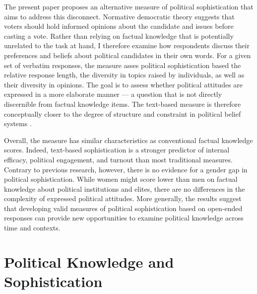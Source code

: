 \documentclass[12pt]{article}
\begin{document}
The present paper proposes an alternative measure of political sophistication that aims to address this disconnect. Normative democratic theory suggests that voters should hold informed opinions about the candidate and issues before casting a vote. Rather than relying on factual knowledge that is potentially unrelated to the task at hand, I therefore examine how respondents discuss their preferences and beliefs about political candidates in their own words. For a given set of verbatim responses, the measure asses political sophistication based the relative response length, the diversity in topics raised by individuals, as well as their diversity in opinions. The goal is to assess whether political attitudes are expressed in a more elaborate manner --- a question that is not directly discernible from factual knowledge items. The text-based measure is therefore conceptually closer to the degree of structure and constraint in political belief systems
\citep[see for example][]{tetlock1983cognitive,luskin1987measuring}. 

Overall, the measure has similar characteristics as conventional factual knowledge scores. Indeed, text-based sophistication is a stronger predictor of internal efficacy, political engagement, and turnout than most traditional measures. Contrary to previous research, however, there is no evidence for a gender gap in political sophistication. While women might score lower than men on factual knowledge about political institutions and elites, there are no differences in the complexity of expressed political attitudes. More generally, the results suggest that developing valid measures of political sophistication based on open-ended responses can provide new opportunities to examine political knowledge across time and contexts. 


\section*{Political Knowledge and Sophistication}
\end{document}
